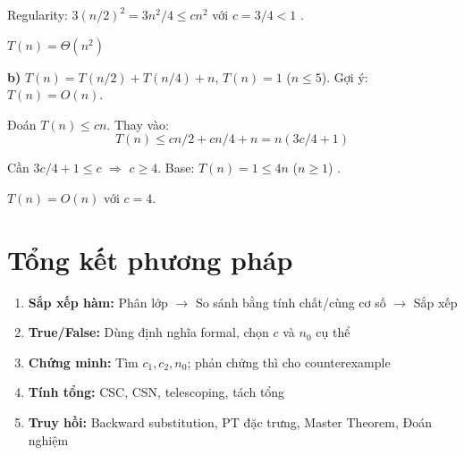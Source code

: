 \documentclass[12pt,a4paper]{article}
\begin{document}
Regularity: $3(n/2)^2 = 3n^2/4 \leq cn^2$ với $c = 3/4 < 1$ \checkmark.

\begin{resultbox}
$T(n) = \Theta(n^2)$
\end{resultbox}

\bigskip

\textbf{b)} $T(n) = T(n/2) + T(n/4) + n$, $T(n) = 1$ ($n \leq 5$). Gợi ý: $T(n) = O(n)$.

Đoán $T(n) \leq cn$. Thay vào:
\[
  T(n) \leq cn/2 + cn/4 + n = n(3c/4 + 1)
\]

Cần $3c/4 + 1 \leq c$ $\Rightarrow$ $c \geq 4$. Base: $T(n) = 1 \leq 4n$ ($n \geq 1$) \checkmark.

\begin{resultbox}
$T(n) = O(n)$ với $c = 4$.
\end{resultbox}

\newpage
\section*{Tổng kết phương pháp}

\begin{notebox}
\begin{enumerate}
  \item \textbf{Sắp xếp hàm:} Phân lớp $\to$ So sánh bằng tính chất/cùng cơ số $\to$ Sắp xếp
  \item \textbf{True/False:} Dùng định nghĩa formal, chọn $c$ và $n_0$ cụ thể
  \item \textbf{Chứng minh:} Tìm $c_1, c_2, n_0$; phản chứng thì cho counterexample
  \item \textbf{Tính tổng:} CSC, CSN, telescoping, tách tổng
  \item \textbf{Truy hồi:} Backward substitution, PT đặc trưng, Master Theorem, Đoán nghiệm
\end{enumerate}
\end{notebox}
\end{document}
